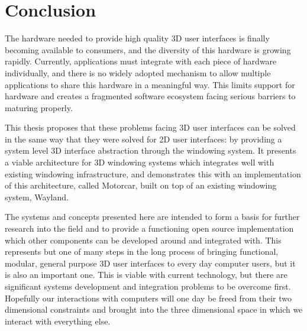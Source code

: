 \chapter{Conclusion}

The hardware needed to provide high quality 3D user interfaces is finally becoming available to consumers, and  the diversity of this hardware is growing rapidly. Currently, applications must integrate with each piece of hardware individually, and there is no widely adopted mechanism to allow multiple applications to share this hardware in a meaningful way. This limits support for hardware and creates a fragmented software ecosystem facing serious barriers to maturing properly.

This thesis proposes that these problems facing 3D user interfaces can be solved in the same way that they were solved for 2D user interfaces: by providing a system level 3D interface abstraction through the windowing system. It presents a viable architecture for 3D windowing systems which integrates well with existing windowing infrastructure, and demonstrates this with an implementation of this architecture, called Motorcar, built on top of an existing windowing system, Wayland. 

The systems and concepts presented here are intended to form a basis for further research into the field and to provide a functioning open source implementation which other components can be developed around and integrated with. This represents but one of many steps in the long process of bringing functional, modular, general purpose 3D user interfaces to every day computer users,  but it is also an important one. This is viable with current technology, but there are significant systems development and integration problems to be overcome first. Hopefully our interactions with computers will one day be freed from their two dimensional constraints and brought into the three dimensional space in which we interact with everything else.

